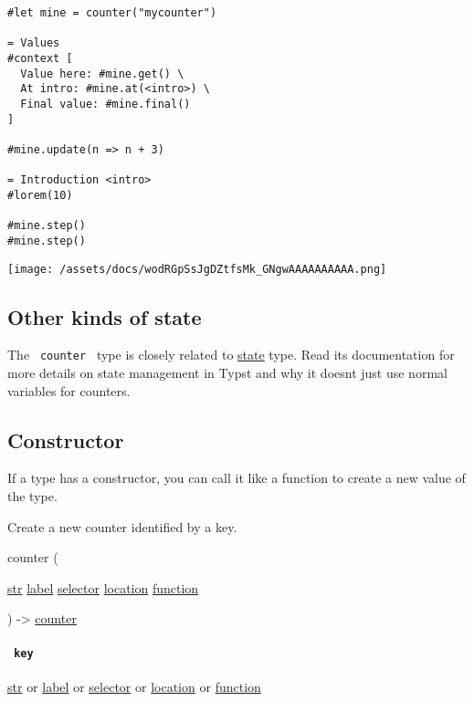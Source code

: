 \begin{verbatim}
#let mine = counter("mycounter")

= Values
#context [
  Value here: #mine.get() \
  At intro: #mine.at(<intro>) \
  Final value: #mine.final()
]

#mine.update(n => n + 3)

= Introduction <intro>
#lorem(10)

#mine.step()
#mine.step()
\end{verbatim}

\texttt{[image: /assets/docs/wodRGpSsJgDZtfsMk\_GNgwAAAAAAAAAA.png]}

\subsection{Other kinds of state}\label{other-state}

The \texttt{\ counter\ } type is closely related to
\href{/docs/reference/introspection/state/}{state} type. Read its
documentation for more details on state management in Typst and why it
doesn\textquotesingle t just use normal variables for counters.

\subsection{\texorpdfstring{Constructor
{}}{Constructor }}\label{constructor}

\label{constructor-constructor-tooltip}
If a type has a constructor, you can call it like a function to create a
new value of the type.

Create a new counter identified by a key.

{ counter } (

{ \href{/docs/reference/foundations/str/}{str}
\href{/docs/reference/foundations/label/}{label}
\href{/docs/reference/foundations/selector/}{selector}
\href{/docs/reference/introspection/location/}{location}
\href{/docs/reference/foundations/function/}{function} }

) -\textgreater{} \href{/docs/reference/introspection/counter/}{counter}

\paragraph{\texorpdfstring{\texttt{\ key\ }}{ key }}\label{constructor-key}

\href{/docs/reference/foundations/str/}{str} {or}
\href{/docs/reference/foundations/label/}{label} {or}
\href{/docs/reference/foundations/selector/}{selector} {or}
\href{/docs/reference/introspection/location/}{location} {or}
\href{/docs/reference/foundations/function/}{function}

